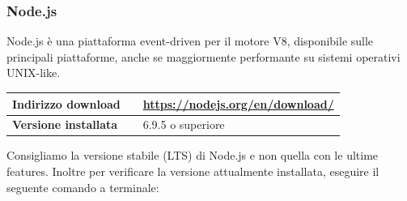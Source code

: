 		\subsubsection{Node.js} \label{nodejs}
		Node.js è una piattaforma event-driven per il motore \js{} V8, disponibile sulle principali piattaforme, anche se maggiormente performante su sistemi operativi UNIX-like.
		\begin{table}[H]
			\centering
			\begin{tabular}{p{2cm}p{0.5cm}p{11.5cm}}
				\arrayrulecolor{lightgray}
				\toprule
				\textbf{Indirizzo download} & &
				\url{https://nodejs.org/en/download/}
				\\ \midrule
				\textbf{Versione installata} & &
				6.9.5 o superiore
				\\ \bottomrule
			\end{tabular}
		\end{table}
		Consigliamo la versione stabile (LTS) di Node.js e non quella con le ultime features. Inoltre per verificare la versione attualmente installata, eseguire il seguente comando a terminale:
		\begin{center}
		\end{center}
